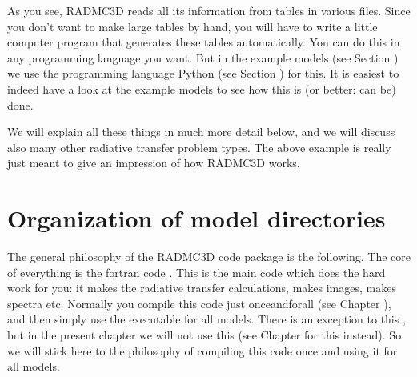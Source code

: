 \documentclass[letterpaper,10pt,english]{sphinxmanual}
\begin{document}
As you see, RADMC\sphinxhyphen{}3D reads all its information from tables in various
files. Since you don’t want to make large tables by hand, you will have to write
a little computer program that generates these tables automatically.  You can do
this in any programming language you want. But in the example models (see
Section {\hyperref[\detokenize{basicstructure:sec-example-models}]{}}) we use the programming language Python (see
Section ) for this. It is easiest to indeed have a look
at the example models to see how this is (or better: can be) done.

We will explain all these things in much more detail below, and we will discuss
also many other radiative transfer problem types. The above example is really
just meant to give an impression of how RADMC\sphinxhyphen{}3D works.


\section{Organization of model directories}
\label{\detokenize{basicstructure:organization-of-model-directories}}\label{\detokenize{basicstructure:sec-rough-overview-models}}
The general philosophy of the RADMC\sphinxhyphen{}3D code package is the following. The core
of everything is the fortran code . This is the main code which does
the hard work for you: it makes the radiative transfer calculations, makes
images, makes spectra etc. Normally you compile this code just once\sphinxhyphen{}and\sphinxhyphen{}for\sphinxhyphen{}all
(see Chapter {\hyperref[\detokenize{installation:chap-compilation}]{}}), and then simply use the executable
 for all models. There is an exception to this , but in the present
chapter we will not use this (see Chapter {\hyperref[\detokenize{internalsetup:chap-internal-setup}]{}} for this
instead). So we will stick here to the philosophy of compiling this code once
and using it for all models.
\end{document}
